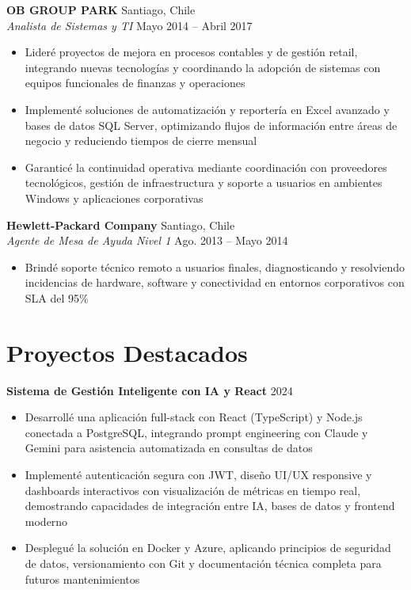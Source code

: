 \documentclass[11pt,letterpaper]{article}
\begin{document}
\vspace{2pt}
\textbf{OB GROUP PARK} \hfill Santiago, Chile\\
\textit{Analista de Sistemas y TI} \hfill Mayo 2014 – Abril 2017
\begin{itemize}
  \item Lideré proyectos de mejora en procesos contables y de gestión retail, integrando nuevas tecnologías y coordinando la adopción de sistemas con equipos funcionales de finanzas y operaciones
  \item Implementé soluciones de automatización y reportería en Excel avanzado y bases de datos SQL Server, optimizando flujos de información entre áreas de negocio y reduciendo tiempos de cierre mensual
  \item Garanticé la continuidad operativa mediante coordinación con proveedores tecnológicos, gestión de infraestructura y soporte a usuarios en ambientes Windows y aplicaciones corporativas
\end{itemize}
\vspace{2pt}
\textbf{Hewlett-Packard Company} \hfill Santiago, Chile\\
\textit{Agente de Mesa de Ayuda Nivel 1} \hfill Ago. 2013 – Mayo 2014
\begin{itemize}
  \item Brindé soporte técnico remoto a usuarios finales, diagnosticando y resolviendo incidencias de hardware, software y conectividad en entornos corporativos con SLA del 95\%
\end{itemize}

\section{Proyectos Destacados}

\textbf{Sistema de Gestión Inteligente con IA y React} \hfill 2024
\begin{itemize}
  \item Desarrollé una aplicación full-stack con React (TypeScript) y Node.js conectada a PostgreSQL, integrando prompt engineering con Claude y Gemini para asistencia automatizada en consultas de datos
  \item Implementé autenticación segura con JWT, diseño UI/UX responsive y dashboards interactivos con visualización de métricas en tiempo real, demostrando capacidades de integración entre IA, bases de datos y frontend moderno
  \item Desplegué la solución en Docker y Azure, aplicando principios de seguridad de datos, versionamiento con Git y documentación técnica completa para futuros mantenimientos
\end{itemize}
\end{document}
